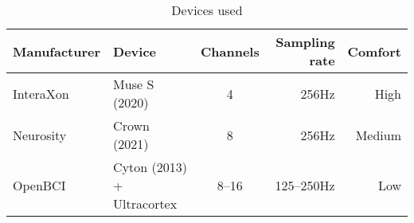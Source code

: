\begin{table}[H]
    \centering
    \begin{tabular}{llcrr}
        \toprule
        Manufacturer
        & Device
        & Channels
        & Sampling rate
        & Comfort
        \\
        \midrule
        InteraXon
        & Muse S (2020)
        & 4
        & 256Hz
        & High
        \\
        Neurosity
        & Crown (2021)
        & 8
        & 256Hz
        & Medium
        \\
        OpenBCI
        & Cyton (2013) + Ultracortex
        & 8--16
        & 125--250Hz
        & Low
        \\
        \bottomrule
    \end{tabular}
    \caption{Devices used}\label{table:devices}
\end{table}
